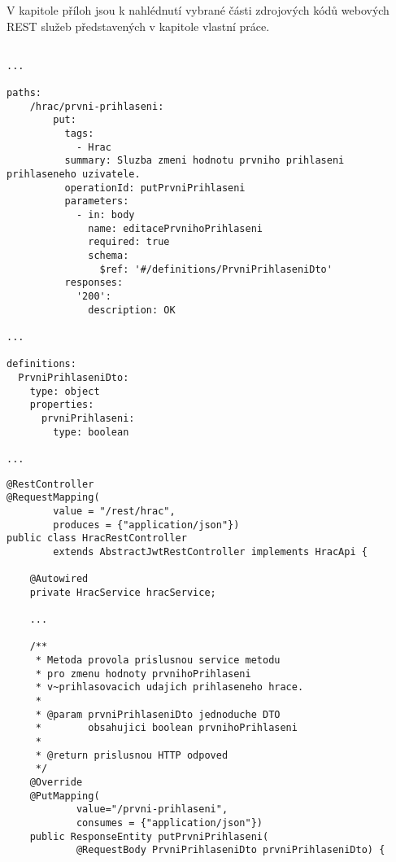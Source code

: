 \documentclass[12pt]{article}
\begin{document}
{\begin{literatura}
\end{literatura}


V kapitole příloh jsou k nahlédnutí vybrané části zdrojových kódů
webových REST služeb představených v kapitole vlastní práce.


\begin{lstlisting}

...

paths:
    /hrac/prvni-prihlaseni:
        put:
          tags:
            - Hrac
          summary: Sluzba zmeni hodnotu prvniho prihlaseni prihlaseneho uzivatele.
          operationId: putPrvniPrihlaseni
          parameters:
            - in: body
              name: editacePrvnihoPrihlaseni
              required: true
              schema:
                $ref: '#/definitions/PrvniPrihlaseniDto'
          responses:
            '200':
              description: OK
              
...

definitions:
  PrvniPrihlaseniDto:
    type: object
    properties:
      prvniPrihlaseni:
        type: boolean

...

\end{lstlisting}


\begin{lstlisting}
@RestController
@RequestMapping(
        value = "/rest/hrac",
        produces = {"application/json"})
public class HracRestController 
        extends AbstractJwtRestController implements HracApi {
    
    @Autowired
    private HracService hracService;
    
    ...
    
    /**
     * Metoda provola prislusnou service metodu
     * pro zmenu hodnoty prvnihoPrihlaseni
     * v~prihlasovacich udajich prihlaseneho hrace.
     *
     * @param prvniPrihlaseniDto jednoduche DTO 
     *        obsahujici boolean prvnihoPrihlaseni
     *                           
     * @return prislusnou HTTP odpoved
     */
    @Override
    @PutMapping(
            value="/prvni-prihlaseni",
            consumes = {"application/json"})
    public ResponseEntity putPrvniPrihlaseni(
            @RequestBody PrvniPrihlaseniDto prvniPrihlaseniDto) {


\end{lstlisting}}
\end{document}

